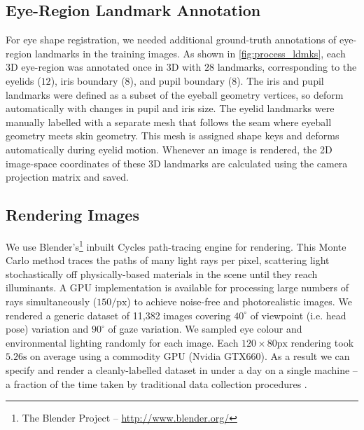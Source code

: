 \subsection{Eye-Region Landmark Annotation}

For eye shape registration, we needed additional ground-truth annotations of eye-region landmarks in the training images.
As shown in \autoref{fig:process_ldmks}, each 3D eye-region was annotated once in 3D with $28$ landmarks, corresponding to the eyelids ($12$), iris boundary ($8$), and pupil boundary ($8$).
The iris and pupil landmarks were defined as a subset of the eyeball geometry vertices, so deform automatically with changes in pupil and iris size.
The eyelid landmarks were manually labelled with a separate mesh that follows the seam where eyeball geometry meets skin geometry.
This mesh is assigned shape keys and deforms automatically during eyelid motion.
%
Whenever an image is rendered, the 2D image-space coordinates of these 3D landmarks are calculated using the camera projection matrix and saved.

\subsection{Rendering Images}

We use Blender's\footnote{The Blender Project -- \url{http://www.blender.org/}} inbuilt Cycles path-tracing engine for rendering.
This Monte Carlo method traces the paths of many light rays per pixel, scattering light stochastically off physically-based materials in the scene until they reach illuminants.
A GPU implementation is available for processing large numbers of rays simultaneously ($150/\textrm{px}$) to achieve noise-free and photorealistic images.
We rendered a generic \dataset dataset of 11,382 images covering $40^{\circ}$ of viewpoint (i.e. head pose) variation and $90^{\circ}$ of gaze variation.
We sampled eye colour and environmental lighting randomly for each image.
Each $120\!\times\!80\textrm{px}$ rendering took $5.26\textrm{s}$ on average using a commodity GPU (Nvidia GTX660).
As a result we can specify and render a cleanly-labelled dataset in under a day on a single machine -- a fraction of the time taken by traditional data collection procedures \cite{zhang15_cvpr}.